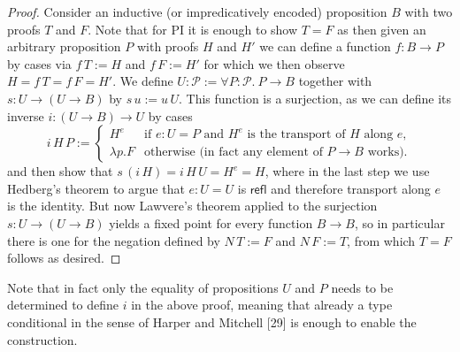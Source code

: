 \documentclass[10pt,a4paper]{amsart}
\begin{document}
\begin{proof}
Consider an inductive (or impredicatively encoded) proposition $B$ with two proofs $T$ and $F$.
Note that for PI it is enough to show $T=F$ as then given an arbitrary proposition $P$ with proofs $H$ and $H'$ we can define a function $f:B\to P$ by cases via $f\,T:=H$ and $f\,F:=H'$ for which we then observe $H=f\,T=f\,F=H'$.
We define $U:\mathcal P:=\forall P:\mathcal P.\ P\to B$ together with $s:U\to(U\to B)$ by $s\,u:=u\,U$.
This function is a surjection, as we can define its inverse $i:(U\to B)\to U$ by cases
\[
i\,H\,P:=\begin{cases}
H^e&\text{if }e:U=P\text{ and }H^e\text{ is the transport of }H\text{ along }e,\\
\lambda p.F&\text{otherwise (in fact any element of }P\to B\text{ works)}.
\end{cases}
\]
and then show that $s\,(i\,H)=i\,H\,U=H^e=H$, where in the last step we use Hedberg's theorem to argue that $e:U=U$ is $\mathsf{refl}$ and therefore transport along $e$ is the identity.
But now Lawvere's theorem applied to the surjection $s:U\to(U\to B)$ yields a fixed point for every function $B\to B$, so in particular there is one for the negation defined by $N\,T:=F$ and $N\,F:=T$, from which $T=F$ follows as desired.
\end{proof}
Note that in fact only the equality of propositions $U$ and $P$ needs to be determined to define $i$ in the above proof, meaning that already a type conditional in the sense of Harper and Mitchell [29] is enough to enable the construction.
\end{document}
